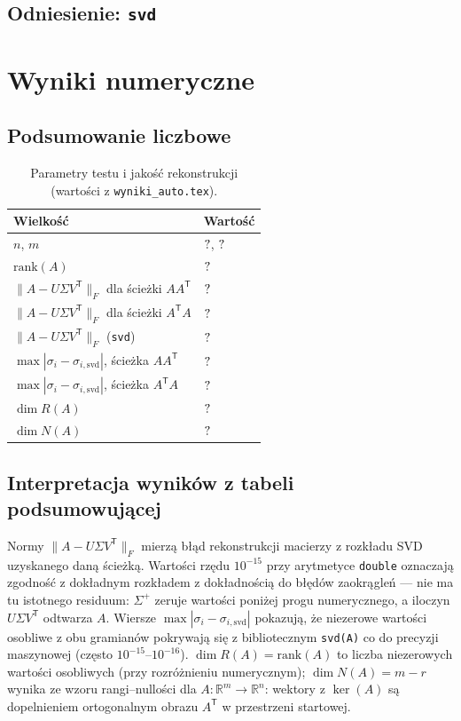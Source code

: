 \documentclass[polish]{template/projectreport}
\begin{document}
\subsection{Odniesienie: \texttt{svd}}


\section{Wyniki numeryczne}

\subsection{Podsumowanie liczbowe}
\begin{table}[htbp]\centering
\caption{Parametry testu i jakość rekonstrukcji (wartości z \texttt{wyniki\_auto.tex}).}
\begin{tabular}{@{}ll@{}}\toprule
Wielkość & Wartość \\ \midrule
$n$, $m$ & $?$, $?$ \\
$\mathrm{rank}(A)$ & $?$ \\
$\|A-U\Sigma V^{\mathsf{T}}\|_F$ dla ścieżki $AA^{\mathsf{T}}$ & $?$ \\
$\|A-U\Sigma V^{\mathsf{T}}\|_F$ dla ścieżki $A^{\mathsf{T}}A$ & $?$ \\
$\|A-U\Sigma V^{\mathsf{T}}\|_F$ (\texttt{svd}) & $?$ \\
$\max|\sigma_i-\sigma_{i,\mathrm{svd}}|$, ścieżka $AA^{\mathsf{T}}$ & $?$ \\
$\max|\sigma_i-\sigma_{i,\mathrm{svd}}|$, ścieżka $A^{\mathsf{T}}A$ & $?$ \\
$\dim R(A)$ & $?$ \\
$\dim N(A)$ & $?$ \\
\bottomrule
\end{tabular}
\end{table}

\subsection{Interpretacja wyników z tabeli podsumowującej}
Normy $\|A-U\Sigma V^{\mathsf{T}}\|_F$ mierzą błąd rekonstrukcji macierzy z rozkładu SVD uzyskanego daną ścieżką.
Wartości rzędu $10^{-15}$ przy arytmetyce \texttt{double} oznaczają zgodność z dokładnym rozkładem z dokładnością do błędów zaokrągleń --- nie ma tu istotnego residuum: $\Sigma^{+}$ zeruje wartości poniżej progu numerycznego, a iloczyn $U\Sigma V^{\mathsf{T}}$ odtwarza $A$.
Wiersze $\max|\sigma_i-\sigma_{i,\mathrm{svd}}|$ pokazują, że niezerowe wartości osobliwe z obu gramianów pokrywają się z bibliotecznym \texttt{svd(A)} co do precyzji maszynowej (często $10^{-15}\mbox{--}10^{-16}$).
$\dim R(A)=\mathrm{rank}(A)$ to liczba niezerowych wartości osobliwych (przy rozróżnieniu numerycznym); $\dim N(A)=m-r$ wynika ze wzoru rangi--nullości dla $A:\mathbb{R}^m\to\mathbb{R}^n$: wektory z $\ker(A)$ są dopelnieniem ortogonalnym obrazu $A^{\mathsf T}$ w przestrzeni startowej.
\end{document}
